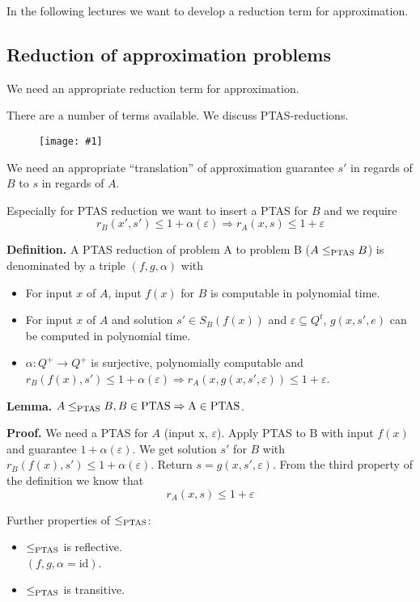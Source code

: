 \documentclass[a4paper]{article}
\newcommand{\drawing}[1]{%
 \begin{figure}[ht]
  \begin{center}
   \texttt{[image: \#1]}
  \end{center}
 \end{figure}
}
\newcommand{\cls}[1]{\rm{#1}}
\begin{document}
In the following lectures we want to develop a reduction term for approximation.

\subsection{Reduction of approximation problems}
%
We need an appropriate reduction term for approximation.

There are a number of terms available. We discuss PTAS-reductions.

\drawing{approximation_reduction.pdf}

We need an appropriate ``translation'' of approximation guarantee $s'$
in regards of $B$ to $s$ in regards of $A$.

Especially for PTAS reduction we want to insert a PTAS for $B$ and
we require
\[
  r_B(x', s') \leq 1 + \alpha(\varepsilon)
    \Rightarrow r_A(x, s) \leq 1 + \varepsilon
\]

\textbf{Definition.}
  A PTAS reduction of problem A to problem B ($A \leq_{\cls{PTAS}} B$)
  is denominated by a triple $(f, g, \alpha)$ with
\begin{itemize}
  \item For input $x$ of $A$, input $f(x)$ for $B$ is computable in polynomial time.
  \item
    For input $x$ of $A$ and solution $s' \in S_B(f(x))$ and
    $\varepsilon \subseteq Q^t$, $g(x, s', e)$ can be computed in polynomial
    time.
  \item
    $\alpha: Q^+ \rightarrow Q^+$ is surjective, polynomially computable
    and $r_B(f(x), s') \leq 1 + \alpha(\varepsilon) \Rightarrow
    r_A(x, g(x, s', \varepsilon)) \leq 1 + \varepsilon$.
\end{itemize}

\textbf{Lemma.}
  $A \leq_{\cls{PTAS}} B, B \in \cls{PTAS} \Rightarrow A \in \cls{PTAS}$.

\textbf{Proof.}
  We need a PTAS for $A$ (input x, $\varepsilon$).
  Apply PTAS to B with input $f(x)$ and guarantee $1 + \alpha(\varepsilon)$.
  We get solution $s'$ for $B$ with $r_B(f(x), s') \leq 1 + \alpha(\varepsilon)$.
  Return $s = g(x, s', \varepsilon)$. From the third property of the definition
  we know that
\[
  r_A(x, s) \leq 1 + \varepsilon
\]

Further properties of $\leq_{\cls{PTAS}}$:
\begin{itemize}
  \item $\leq_{\cls{PTAS}}$ is reflective. \\
        $(f, g, \alpha = \text{id})$.
  \item $\leq_{\cls{PTAS}}$ is transitive.
\end{itemize}
\end{document}

